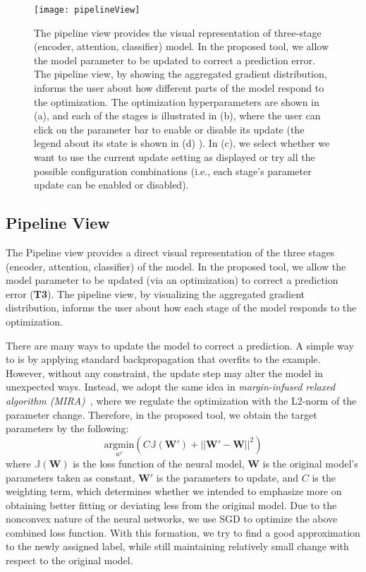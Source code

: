 \begin{figure}[htbp]
\centering
\vspace{-2mm}
 \texttt{[image: pipelineView]}
 \caption{
 The pipeline view provides the visual representation of three-stage (encoder, attention, classifier) model. In the proposed tool, we allow the model parameter to be updated to correct a prediction error. The pipeline view, by showing the aggregated gradient distribution, informs the user about how different parts of the model respond to the optimization.
 The optimization hyperparameters are shown in (a), and each of the stages is illustrated in (b), where the user can click on the parameter bar to enable or disable its update (the legend about its state is shown in (d) ). In (c), we select whether we want to use the current update setting as displayed or try all the possible configuration combinations (i.e., each stage's parameter update can be enabled or disabled).
 }
\label{fig:pipelineView}
\end{figure}

\subsection{Pipeline View}
\label{sec:pipeline}
The Pipeline view provides a direct visual representation of the three stages (encoder, attention, classifier) of the model. In the proposed tool, we allow the model parameter to be updated (via an optimization) to correct a prediction error (\textbf{T3}). The pipeline view, by visualizing the aggregated gradient distribution, informs the user about how each stage of the model responds to the optimization.

There are many ways to update the model to correct a prediction. A simple way to is by applying standard backpropagation that overfits to the example. However, without any constraint, the update step may alter the model in unexpected ways.
Instead, we adopt the same idea in \emph{margin-infused relaxed algorithm (MIRA)}~\cite{CrammerSinger2003}, where we regulate the optimization with the L2-norm of the parameter change. Therefore, in the proposed tool, we obtain the target parameters by the following:
\begin{equation}
\underset{w'}{\mathrm{argmin}}( C \mathbb{J}(\mathbf{W}') + ||\mathbf{W}' - \mathbf{W}||^2)
\end{equation}
where $\mathbb{J}(\mathbf{W})$ is the loss function of the neural model, $\mathbf{W}$ is the original model's parameters taken as constant, $\mathbf{W}'$ is the parameters to update, and $C$ is the weighting term, which determines whether we intended to emphasize more on obtaining better fitting or deviating less from the original model. Due to the nonconvex nature of the neural networks, we use SGD to optimize the above combined loss function.
%
With this formation, we try to find a good approximation to the newly assigned label, while still maintaining relatively small change with respect to the original model.

